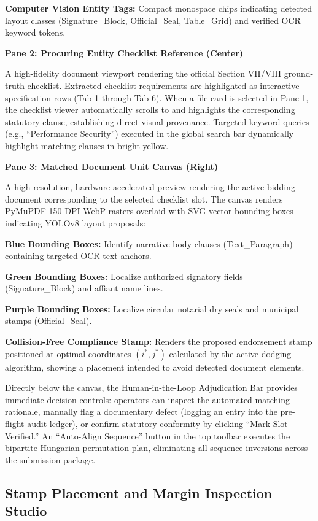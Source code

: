 \textbf{Computer Vision Entity Tags:} Compact monospace chips indicating detected layout classes (Signature\_Block, Official\_Seal, Table\_Grid) and verified OCR keyword tokens.

\textbf{Pane 2: Procuring Entity Checklist Reference (Center)}

A high-fidelity document viewport rendering the official Section VII/VIII ground-truth checklist. Extracted checklist requirements are highlighted as interactive specification rows (Tab 1 through Tab 6). When a file card is selected in Pane 1, the checklist viewer automatically scrolls to and highlights the corresponding statutory clause, establishing direct visual provenance. Targeted keyword queries (e.g., ``Performance Security'') executed in the global search bar dynamically highlight matching clauses in bright yellow.

\textbf{Pane 3: Matched Document Unit Canvas (Right)}

A high-resolution, hardware-accelerated preview rendering the active bidding document corresponding to the selected checklist slot. The canvas renders PyMuPDF 150 DPI WebP rasters overlaid with SVG vector bounding boxes indicating YOLOv8 layout proposals:

\textbf{Blue Bounding Boxes:} Identify narrative body clauses (Text\_Paragraph) containing targeted OCR text anchors.

\textbf{Green Bounding Boxes:} Localize authorized signatory fields (Signature\_Block) and affiant name lines.

\textbf{Purple Bounding Boxes:} Localize circular notarial dry seals and municipal stamps (Official\_Seal).

\textbf{Collision-Free Compliance Stamp:} Renders the proposed endorsement stamp positioned at optimal coordinates $(i^*,j^*)$ calculated by the active dodging algorithm, showing a placement intended to avoid detected document elements.

Directly below the canvas, the Human-in-the-Loop Adjudication Bar provides immediate decision controls: operators can inspect the automated matching rationale, manually flag a documentary defect (logging an entry into the pre-flight audit ledger), or confirm statutory conformity by clicking ``Mark Slot Verified.'' An ``Auto-Align Sequence'' button in the top toolbar executes the bipartite Hungarian permutation plan, eliminating all sequence inversions across the submission package.

\subsection{Stamp Placement and Margin Inspection Studio}
\label{sec:ui_stamp_studio}

